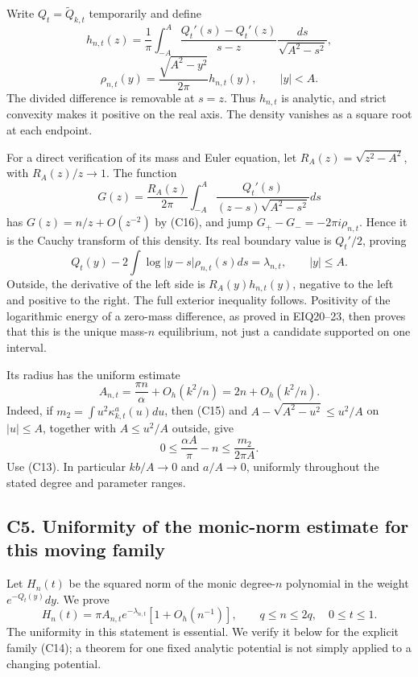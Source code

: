 \documentclass[
  11pt,
]{article}
\begin{document}
Write \(Q_t=\widetilde Q_{k,t}\) temporarily and define \[
h_{n,t}(z)=\frac1\pi\int_{-A}^A
\frac{Q_t'(s)-Q_t'(z)}{s-z}\frac{ds}{\sqrt{A^2-s^2}},
\] \[
\rho_{n,t}(y)=\frac{\sqrt{A^2-y^2}}{2\pi}h_{n,t}(y),
\qquad |y|<A.
\tag{C17}
\] The divided difference is removable at \(s=z\). Thus \(h_{n,t}\) is
analytic, and strict convexity makes it positive on the real axis. The
density vanishes as a square root at each endpoint.

For a direct verification of its mass and Euler equation, let
\(R_A(z)=\sqrt{z^2-A^2}\), with \(R_A(z)/z\to1\). The function \[
G(z)=\frac{R_A(z)}{2\pi}\int_{-A}^A
\frac{Q_t'(s)}{(z-s)\sqrt{A^2-s^2}}ds
\] has \(G(z)=n/z+O(z^{-2})\) by (C16), and jump
\(G_+-G_-=-2\pi i\rho_{n,t}\). Hence it is the Cauchy transform of this
density. Its real boundary value is \(Q_t'/2\), proving \[
\boxed{Q_t(y)-2\int\log|y-s|\rho_{n,t}(s)ds
=\lambda_{n,t},\qquad |y|\le A.}\tag{C18}
\] Outside, the derivative of the left side is \(R_A(y)h_{n,t}(y)\),
negative to the left and positive to the right. The full exterior
inequality follows. Positivity of the logarithmic energy of a zero-mass
difference, as proved in EIQ20--23, then proves that this is the unique
mass-\(n\) equilibrium, not just a candidate supported on one interval.

Its radius has the uniform estimate \[
\boxed{A_{n,t}=\frac{\pi n}{\alpha}+O_h(k^2/n)=2n+O_h(k^2/n).}\tag{C19}
\] Indeed, if \(m_2=\int u^2\kappa^a_{k,t}(u)du\), then (C15) and
\(A-\sqrt{A^2-u^2}\le u^2/A\) on \(|u|\le A\), together with
\(A\le u^2/A\) outside, give \[
0\le\frac{\alpha A}{\pi}-n\le\frac{m_2}{2\pi A}.
\] Use (C13). In particular \(kb/A\to0\) and \(a/A\to0\), uniformly
throughout the stated degree and parameter ranges.

\subsection{C5. Uniformity of the monic-norm estimate for this moving
family}\label{c5.-uniformity-of-the-monic-norm-estimate-for-this-moving-family}

Let \(H_n(t)\) be the squared norm of the monic degree-\(n\) polynomial
in the weight \(e^{-Q_t(y)}dy\). We prove \[
\boxed{H_n(t)=\pi A_{n,t}e^{-\lambda_{n,t}}
\left[1+O_h(n^{-1})\right],
\qquad q\le n\le2q,\quad0\le t\le1.}\tag{C20}
\] The uniformity in this statement is essential. We verify it below for
the explicit family (C14); a theorem for one fixed analytic potential is
not simply applied to a changing potential.
\end{document}

